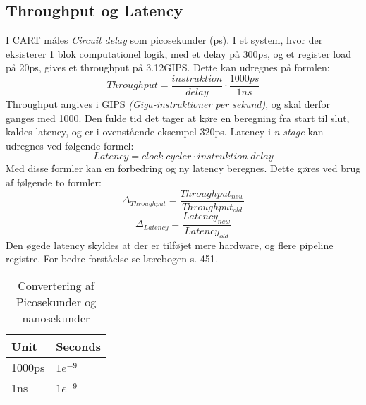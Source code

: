\subsection{Throughput og Latency}
I CART måles \textit{Circuit delay} som picosekunder (ps).
I et system, hvor der eksisterer 1 blok computationel logik, med et delay på 300ps, og et register load på 20ps, gives et throughput på 3.12GIPS.
Dette kan udregnes på formlen:
\begin{equation}
    Throughput=\frac{instruktion}{delay}\cdot\frac{1000ps}{1ns}
\end{equation}
Throughput angives i GIPS \textit{(Giga-instruktioner per sekund)}, og skal derfor ganges med 1000.
Den fulde tid det tager at køre en beregning fra start til slut, kaldes latency, og er i ovenstående eksempel 320ps.
Latency i \textit{n-stage} kan udregnes ved følgende formel:
\begin{equation}
    Latency=clock\;cycler\cdot instruktion\;delay
\end{equation}
Med disse formler kan en forbedring og ny latency beregnes.
Dette gøres ved brug af følgende to formler:
\begin{equation}
    \Delta_{Throughput}= \frac{Throughput_{new}}{Throughput_{old}}
\end{equation}
\begin{equation}
    \Delta_{Latency}=\frac{Latency_{new}}{Latency_{old}}
\end{equation}
Den øgede latency skyldes at der er tilføjet mere hardware, og flere pipeline registre.
For bedre forståelse se lærebogen s. 451.
\begin{table}[h!]
    \centering
    \begin{tabular}{ll}
        \hline
        Unit&Seconds\\\hline
        1000ps&$1e^{-9}$\\
        1ns&$1e^{-9}$\\\hline
    \end{tabular}
    \caption{Convertering af Picosekunder og nanosekunder}
\end{table}
